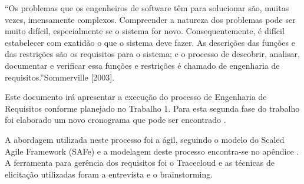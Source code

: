 “Os problemas que os engenheiros de software têm para solucionar são, muitas vezes, imensamente complexos. Compreender a natureza dos problemas pode ser muito difícil, especialmente se o sistema for novo. Consequentemente, é difícil estabelecer com exatidão o que o sistema deve fazer. As descrições das funções e das restrições são os requisitos para o sistema; e o processo de descobrir, analisar, documentar e verificar essa funções e restrições é chamado de engenharia de requisitos.”Sommerville [2003].

Este documento irá apresentar a execução do processo de Engenharia de Requisitos conforme planejado no Trabalho 1. Para esta segunda fase  do trabalho foi elaborado um novo cronograma que pode ser encontrado \cite{ Cronograma }.

A abordagem utilizada neste processo foi a ágil,  seguindo o modelo do Scaled Agile Framework (SAFe) e a modelagem deste processo encontra-se no apêndice \cite{Processo de Engenharia de Requisitos}. A ferramenta para gerência dos requisitos foi o Tracecloud e as técnicas de elicitação utilizadas foram a entrevista e  o brainstorming.
